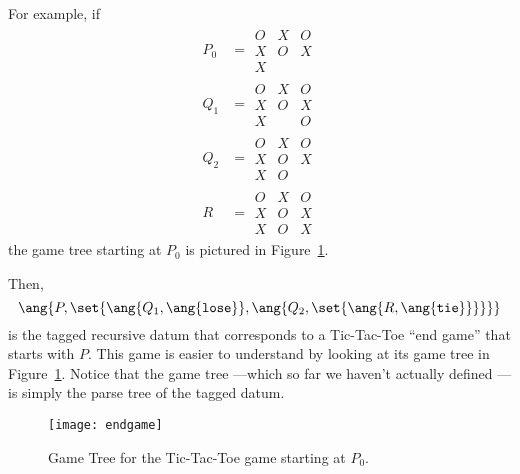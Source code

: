 \begin{definition}
For example, if
\begin{align*}
P_0 & =  \begin{array}{c|c|c}
                O & X & O\\
         \hline X & O & X\\
         \hline X & &
        \end{array}\\
Q_1 & = \begin{array}{c|c|c}
                O & X & O\\
         \hline X & O & X\\
         \hline X &  & O
        \end{array}\\
Q_2 & = \begin{array}{c|c|c}
                O & X & O\\
         \hline X & O & X\\
         \hline X & O & 
        \end{array}\\
R & = \begin{array}{c|c|c}
                O & X & O\\
         \hline X & O & X\\
         \hline X & O & X
        \end{array}
\end{align*}
the game tree starting at $P_0$ is pictured in Figure~\ref{fig:endgame}.

\begin{editingnotes}

Then,
\begin{equation}\label{endgame}
\ang{P, \set{\ang{Q_1, \ang{\texttt{lose}}},
             \ang{Q_2, \set{\ang{R,\ang{\texttt{tie}}}}}}}
\end{equation}
is the tagged recursive datum that corresponds to a Tic-Tac-Toe ``end
game'' that starts with $P$.  This game is easier to understand by looking
at its game tree in Figure~\ref{fig:endgame}.  Notice that the game tree
---which so far we haven't actually defined ---is simply the parse tree of
the tagged datum.

\end{editingnotes}

\begin{figure}[htbp]
\texttt{[image: endgame]}
\caption{Game Tree for the Tic-Tac-Toe game starting at $P_0$.}
\label{fig:endgame}
\end{figure}


\end{definition}
